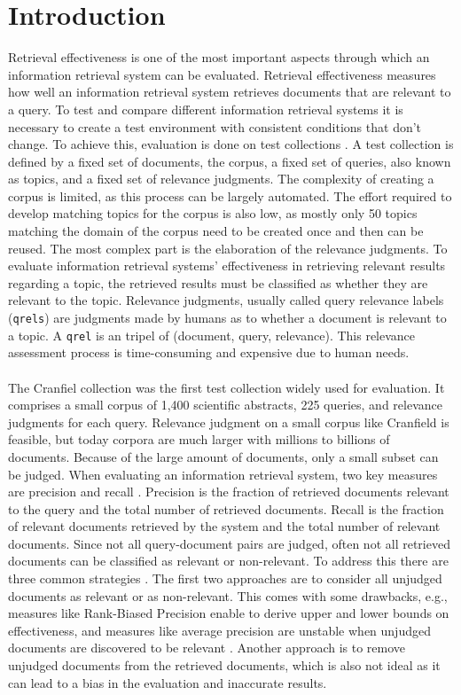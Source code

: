 \chapter{Introduction}\label{introduction} 

Retrieval effectiveness is one of the most important aspects through which an information retrieval system can be evaluated. Retrieval effectiveness measures how well an information retrieval system retrieves documents that are relevant to a query. To test and compare different information retrieval systems it is necessary to create a test environment with consistent conditions that don't change. To achieve this, evaluation is done on test collections \citep{sanderson:2010}. A test collection is defined by a fixed set of documents, the corpus, a fixed set of queries, also known as topics, and a fixed set of relevance judgments. The complexity of creating a corpus is limited, as this process can be largely automated. The effort required to develop matching topics for the corpus is also low, as mostly only 50 topics matching the domain of the corpus need to be created once and then can be reused. The most complex part is the elaboration of the relevance judgments. To evaluate information retrieval systems' effectiveness in retrieving relevant results regarding a topic, the retrieved results must be classified as whether they are relevant to the topic. Relevance judgments, usually called query relevance labels (\texttt{qrels}) are judgments made by humans as to whether a document is relevant to a topic. A \texttt{qrel} is an tripel of (document, query, relevance). This relevance assessment process is time-consuming and expensive due to human needs.
\\\\
The Cranfiel collection \citep{cleverdon:91} was the first test collection widely used for evaluation. It comprises a small corpus of 1,400 scientific abstracts, 225 queries, and relevance judgments for each query. Relevance judgment on a small corpus like Cranfield is feasible, but today corpora are much larger with millions to billions of documents. Because of the large amount of documents, only a small subset can be judged. When evaluating an information retrieval system, two key measures are precision and recall \citep{voorhees:2001}. Precision is the fraction of retrieved documents relevant to the query and the total number of retrieved documents. Recall is the fraction of relevant documents retrieved by the system and the total number of relevant documents. Since not all query-document pairs are judged, often not all retrieved documents can be classified as relevant or non-relevant. To address this there are three common strategies \citep{froebe:2023}. The first two approaches are to consider all unjudged documents as relevant or as non-relevant. This comes with some drawbacks, e.g., measures like Rank-Biased Precision enable to derive upper and lower bounds on effectiveness, and measures like average precision are unstable when unjudged documents are discovered to be relevant \citep{moffat:08}. Another approach is to remove unjudged documents from the retrieved documents, which is also not ideal as it can lead to a bias in the evaluation and inaccurate results.

